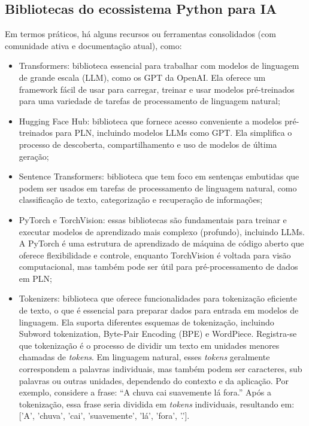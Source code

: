 \documentclass[10pt, conference, compsocconf]{IEEEtran}
\begin{document}
\subsection{Bibliotecas do ecossistema Python para IA}

Em termos práticos, há alguns recursos ou ferramentas consolidados (com comunidade ativa e documentação atual), como:
\begin{itemize}
    \item Transformers: biblioteca  essencial para trabalhar com modelos de linguagem de grande escala (LLM), como os GPT da OpenAI. Ela oferece um framework fácil de usar para carregar, treinar e usar modelos pré-treinados para uma variedade de tarefas de processamento de linguagem natural;
    \item Hugging Face Hub: biblioteca que fornece acesso conveniente a modelos pré-treinados para PLN, incluindo modelos LLMs como GPT. Ela simplifica o processo de descoberta, compartilhamento e uso de modelos de última geração;
    \item Sentence Transformers:  biblioteca que tem foco em   sentenças embutidas que podem ser usados em tarefas de processamento de linguagem natural, como classificação de texto, categorização e recuperação de informações;
    \item PyTorch e TorchVision: essas bibliotecas são fundamentais para treinar e executar modelos de aprendizado mais complexo (profundo), incluindo LLMs. A PyTorch é uma estrutura de aprendizado de máquina de código aberto que oferece flexibilidade e controle, enquanto TorchVision é voltada para visão computacional, mas também pode ser útil para pré-processamento de dados em PLN;
    \item Tokenizers:  biblioteca que oferece funcionalidades para tokenização eficiente de texto, o que é essencial para preparar dados para entrada em modelos de linguagem. Ela suporta diferentes esquemas de tokenização, incluindo Subword tokenization, Byte-Pair Encoding (BPE) e WordPiece. Registra-se que tokenização é o processo de dividir um texto em unidades menores chamadas de \textit{tokens}. Em linguagem natural, esses \textit{tokens} geralmente correspondem a palavras individuais, mas também podem ser caracteres, sub palavras ou outras unidades, dependendo do contexto e da aplicação. Por exemplo, considere a frase: ``A chuva cai suavemente lá fora.'' Após a tokenização, essa frase seria dividida em \textit{tokens} individuais, resultando em: ['A', 'chuva', 'cai', 'suavemente', 'lá', 'fora', '.'].    
\end{itemize}
\end{document}

